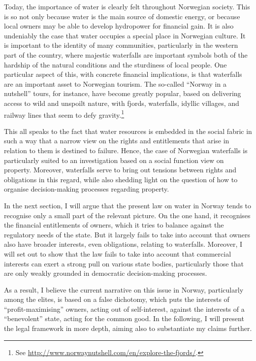 Today, the importance of water is clearly felt throughout Norwegian society. This is so not only because water is the main source of domestic energy, or because local owners may be able to develop hydropower for financial gain. It is also undeniably the case that water occupies a special place in Norwegian culture. It is important to the identity of many communities, particularly in the western part of the country, where majestic waterfalls are important symbols both of the hardship of the natural conditions and the sturdiness of local people. One particular aspect of this, with concrete financial implications, is that waterfalls are an important asset to Norwegian tourism. The so-called ``Norway in a nutshell'' tours, for instance, have become greatly popular, based on delivering access to wild and unspoilt nature, with fjords, waterfalls, idyllic villages, and railway lines that seem to defy gravity.\footnote{See \url{http://www.norwaynutshell.com/en/explore-the-fjords/}.}

This all speaks to the fact that water resources is embedded in the social fabric in such a way that a narrow view on the rights and entitlements that arise in relation to them is destined to failure. Hence, the case of Norwegian waterfalls is particularly suited to an investigation based on a social function view on property. Moreover, waterfalls serve to bring out tensions between rights and obligations in this regard, while also shedding light on the question of how to organise decision-making processes regarding property.

In the next section, I will argue that the present law on water in Norway tends to recognise only a small part of the relevant picture. On the one hand, it recognises the financial entitlements of owners, which it tries to balance against the regulatory needs of the state. But it largely fails to take into account that owners also have broader interests, even obligations, relating to waterfalls. Moreover, I will set out to show that the law fails to take into account that commercial interests can exert a strong pull on various state bodies, particularly those that are only weakly grounded in democratic decision-making processes. 

As a result, I believe the current narrative on this issue in Norway, particularly among the elites, is based on a false dichotomy, which puts the interests of ``profit-maximising'' owners, acting out of self-interest, against the interests of a ``benevolent'' state, acting for the common good. In the following, I will present the legal framework in more depth, aiming also to substantiate my claims further.

